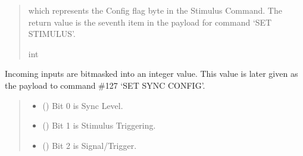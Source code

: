 \documentclass[letterpaper,10pt,english]{sphinxmanual}
\begin{document}
\begin{fulllineitems}
\begin{fulllineitems}
\begin{quote}
\begin{description}
\begin{itemize}
\end{itemize}

\sphinxAtStartPar
which represents the Config flag byte in the Stimulus Command.                 The return value is the seventh item in the payload for command ‘SET STIMULUS’.

\sphinxAtStartPar
int

\end{description}\end{quote}

\end{fulllineitems}


\begin{fulllineitems}
\label{\detokenize{PodApi.Devices:PodApi.Devices.PodDevice_8480SC.Pod8480SC.SyncConfigBits}}
\pysigstartsignatures
{}
\pysigstopsignatures
\sphinxAtStartPar
Incoming inputs are bitmasked into an integer value. This value is later given         as the payload to command \#127 ‘SET SYNC CONFIG’.
\begin{quote}\begin{description}
\begin{itemize}
\item {} 
\sphinxAtStartPar
{} () \textendash{} Bit 0 is Sync Level.

\item {} 
\sphinxAtStartPar
{} () \textendash{} Bit 1 is Stimulus Triggering.

\item {} 
\sphinxAtStartPar
{} () \textendash{} Bit 2 is Signal/Trigger.


\end{itemize}
\end{description}
\end{quote}
\end{fulllineitems}
\end{fulllineitems}
\end{document}

